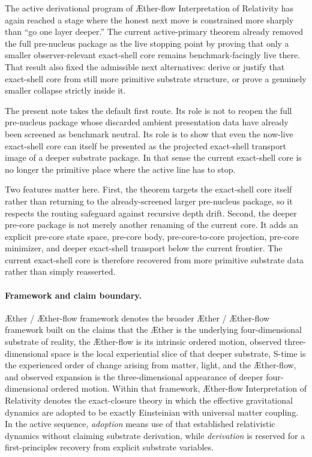 \documentclass[11pt]{article}
\newcommand{\Aether}{\AE{}ther}
\newcommand{\Aflow}{\AE{}ther-flow}
\newcommand{\TheoryName}{\Aflow{} Interpretation of Relativity}
\newcommand{\TheoryProgram}{\Aether{} / \Aflow{} framework}
\begin{document}
The active derivational program of \TheoryName{} has again reached a stage where the honest next move is constrained more sharply than ``go one layer deeper.'' The current active-primary theorem already removed the full pre-nucleus package as the live stopping point by proving that only a smaller observer-relevant exact-shell core remains benchmark-facingly live there. That result also fixed the admissible next alternatives: derive or justify that exact-shell core from still more primitive substrate structure, or prove a genuinely smaller collapse strictly inside it.

The present note takes the default first route. Its role is not to reopen the full pre-nucleus package whose discarded ambient presentation data have already been screened as benchmark neutral. Its role is to show that even the now-live exact-shell core can itself be presented as the projected exact-shell transport image of a deeper substrate package. In that sense the current exact-shell core is no longer the primitive place where the active line has to stop.

Two features matter here. First, the theorem targets the exact-shell core itself rather than returning to the already-screened larger pre-nucleus package, so it respects the routing safeguard against recursive depth drift. Second, the deeper pre-core package is not merely another renaming of the current core. It adds an explicit pre-core state space, pre-core body, pre-core-to-core projection, pre-core minimizer, and deeper exact-shell transport below the current frontier. The current exact-shell core is therefore recovered from more primitive substrate data rather than simply reasserted.

\paragraph{Framework and claim boundary.}
\TheoryProgram{} denotes the broader \Aether{} / \Aflow{} framework built on the claims that the \Aether{} is the underlying four-dimensional substrate of reality, the \Aflow{} is its intrinsic ordered motion, observed three-dimensional space is the local experiential slice of that deeper substrate, S-time is the experienced order of change arising from matter, light, and the \Aflow{}, and observed expansion is the three-dimensional appearance of deeper four-dimensional ordered motion. Within that framework, \TheoryName{} denotes the exact-closure theory in which the effective gravitational dynamics are adopted to be exactly Einsteinian with universal matter coupling. In the active sequence, \emph{adoption} means use of that established relativistic dynamics without claiming substrate derivation, while \emph{derivation} is reserved for a first-principles recovery from explicit substrate variables.
\end{document}
